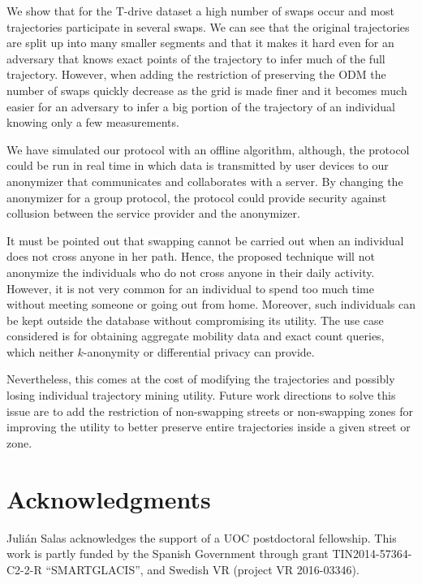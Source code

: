 \documentclass{llncs}
\begin{document}
We show that for the T-drive dataset a high number of swaps occur and
most trajectories participate in several swaps. We can see that the
original trajectories are split up into many smaller segments and that
it makes it hard even for an adversary that knows exact points of the
trajectory to infer much of the full trajectory. However, when adding
the restriction of preserving the ODM the number of swaps quickly
decrease as the grid is made finer and it becomes much easier for an
adversary to infer a big portion of the trajectory of an individual
knowing only a few measurements.

We have simulated our protocol with an offline algorithm, although, the protocol could be run in real time in which data is transmitted by user devices to our anonymizer that communicates and collaborates with a server. By changing the anonymizer for a group protocol, the protocol could provide security against collusion between the service provider and the anonymizer.
%
%

It must be pointed out that swapping cannot be carried out when an individual does not cross anyone in her path. Hence, the proposed technique will not anonymize the individuals who do not cross anyone in their daily activity.
However, it is not very common for an individual to spend too much time without meeting someone or going out from home. Moreover, such individuals can be kept outside the database without compromising its utility.
The use case considered is for obtaining aggregate mobility data and exact count queries, which neither $k$-anonymity or differential privacy can provide.

Nevertheless, this comes at the cost of modifying the trajectories and possibly losing individual trajectory mining utility.
Future work directions to solve this issue are to add the restriction of non-swapping streets or non-swapping zones for improving the utility to better preserve entire trajectories inside a given street or zone.

\section*{Acknowledgments}
Juli\'{a}n Salas acknowledges the support of a UOC postdoctoral fellowship.
This work is partly funded by the Spanish Government through grant TIN2014-57364-C2-2-R ``SMARTGLACIS'', and Swedish VR (project VR 2016-03346).



\end{document}
